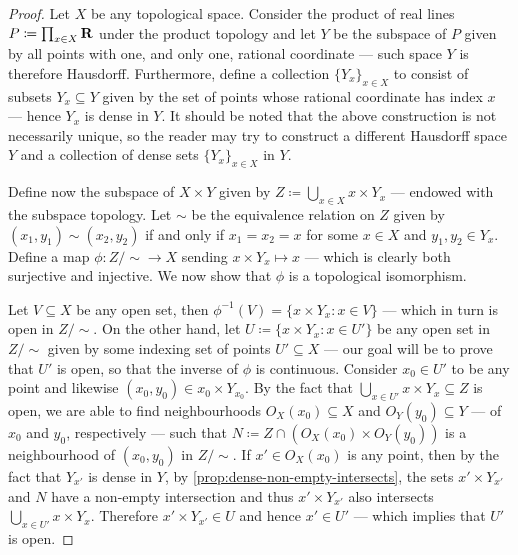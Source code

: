 \begin{proof}
Let \(X\) be any topological space. Consider the product of real lines
\(P \coloneq \prod_{x \in X} \mathbf{R}\) under the product topology and let \(Y\) be
the subspace of \(P\) given by all points with one, and only one, rational
coordinate --- such space \(Y\) is therefore Hausdorff. Furthermore, define a
collection \(\{Y_{x}\}_{x \in X}\) to consist of subsets \(Y_x \subseteq Y\)
given by the set of points whose rational coordinate has index \(x\) --- hence
\(Y_x\) is dense in \(Y\). It should be noted that the above construction is
not necessarily unique, so the reader may try to construct a different Hausdorff
space \(Y\) and a collection of dense sets \(\{Y_{x}\}_{x \in X}\) in \(Y\).

Define now the subspace of \(X \times Y\) given by
\(Z \coloneq \bigcup_{x \in X} x \times Y_x\) --- endowed with the subspace
topology. Let \(\sim\) be the equivalence relation on \(Z\) given by
\((x_1, y_1) \sim (x_2, y_2)\) if and only if \(x_1 = x_2 = x\) for some
\(x \in X\) and \(y_1, y_2 \in Y_x\). Define a map \(\phi: Z/{\sim} \to X\)
sending \(x \times Y_x \mapsto x\) --- which is clearly both surjective and
injective. We now show that \(\phi\) is a topological isomorphism.

Let \(V \subseteq X\) be any open set, then
\(\phi^{-1}(V) = \{x \times Y_x \colon x \in V\}\) --- which in turn is open in
\(Z/{\sim}\). On the other hand, let
\(U \coloneq \{x \times Y_{x} \colon x \in U'\}\) be any open set in
\(Z/{\sim}\) given by some indexing set of points \(U' \subseteq X\) --- our
goal will be to prove that \(U'\) is open, so that the inverse of \(\phi\) is
continuous. Consider \(x_0 \in U'\) to be any point and likewise
\((x_0, y_0) \in x_0 \times Y_{x_0}\). By the fact that
\(\bigcup_{x \in U'} x \times Y_x \subseteq Z\) is open, we are able to find
neighbourhoods \(O_X(x_0) \subseteq X\) and \(O_Y(y_0) \subseteq Y\) --- of
\(x_0\) and \(y_0\), respectively --- such that
\(N \coloneq Z \cap (O_X(x_0) \times O_Y(y_0))\) is a neighbourhood of
\((x_0, y_0)\) in \(Z/{\sim}\). If \(x' \in O_X(x_0)\) is any point, then by the
fact that \(Y_{x'}\) is dense in \(Y\), by
\cref{prop:dense-non-empty-intersects}, the sets \(x' \times Y_{x'}\) and \(N\)
have a non-empty intersection and thus \(x' \times Y_{x'}\) also intersects
\(\bigcup_{x \in U'} x \times Y_x\). Therefore \(x' \times Y_{x'} \in U\) and
hence \(x' \in U'\) --- which implies that \(U'\) is open.
\end{proof}

